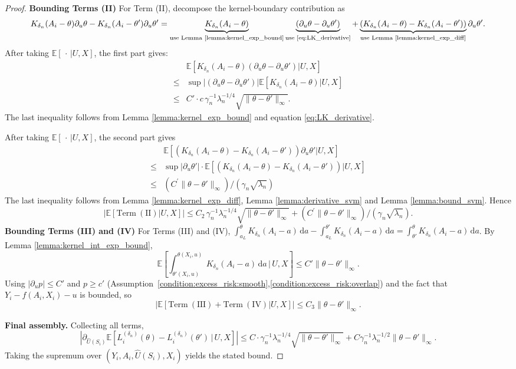 \documentclass[12pt]{article}
\newcommand{\E}{\mathbb{E}}
\begin{document}
\begin{proof}
\noindent\textbf{Bounding Terms (II)}
For Term (II), decompose the kernel-boundary contribution as
$$K_{\delta_n}(A_i-\theta)\partial_u\theta - K_{\delta_n}(A_i-\theta')\partial_u\theta' = \underbrace{K_{\delta_n}(A_i-\theta)}_{\text{use Lemma \ref{lemma:kernel_exp_bound}}}\underbrace{(\partial_u\theta-\partial_u\theta')}_{\text{use \eqref{eq:LK_derivative}}} + \underbrace{(K_{\delta_n}(A_i-\theta)-K_{\delta_n}(A_i-\theta'))}_{\text{use Lemma \ref{lemma:kernel_exp_diff}}}\partial_u\theta'.$$
After taking $\E[\,\cdot\,|U,X]$, the first part gives:
\begin{align*}
&\E\left[K_{\delta_n}(A_i-\theta)(\partial_u\theta-\partial_u\theta')|U,X\right]\\
\leq & \sup\left|(\partial_u\theta-\partial_u\theta')\right| \E\left[K_{\delta_n}(A_i-\theta)|U,X\right]\\
\leq & C'\cdot c\,\gamma_n^{-1}\lambda_n^{-1/4}\sqrt{\|\theta-\theta'\|_\infty}.
\end{align*}
The last inequality follows from Lemma \ref{lemma:kernel_exp_bound} and equation \eqref{eq:LK_derivative}.

After taking $\E[\,\cdot\,|U,X]$, the second part gives
\begin{align*}
    &\E\left[(K_{\delta_n}(A_i-\theta)-K_{\delta_n}(A_i-\theta'))\partial_u\theta'|U,X\right]\\
    \leq & \sup|\partial_u\theta'| \cdot \E\left[(K_{\delta_n}(A_i-\theta)-K_{\delta_n}(A_i-\theta'))|U,X\right]\\
    \leq &(C^\prime\|\theta-\theta'\|_\infty)/(\gamma_n\sqrt{\lambda_n})
\end{align*}
The last inequality follows from Lemma \ref{lemma:kernel_exp_diff}, Lemma \ref{lemma:derivative_svm} and Lemma \ref{lemma:bound_svm}. Hence
$$\left|\E[\mathrm{Term\ (II)}|U,X]\right| \leq C_2\,\gamma_n^{-1}\lambda_n^{-1/4}\sqrt{\|\theta-\theta'\|_\infty}+(C^\prime\|\theta-\theta'\|_\infty)/(\gamma_n\sqrt{\lambda_n}).$$
\noindent\textbf{Bounding Terms (III) and (IV)}
For Terms (III) and (IV), $\int_{a_L}^{\theta}K_{\delta_n}(A_i-a)\,\mathrm{d}a - \int_{a_L}^{\theta'}K_{\delta_n}(A_i-a)\,\mathrm{d}a = \int_{\theta'}^{\theta}K_{\delta_n}(A_i-a)\,\mathrm{d}a$.  By Lemma \ref{lemma:kernel_int_exp_bound},
$$\E\!\left[\int_{\theta'(X_i,u)}^{\theta(X_i,u)}K_{\delta_n}(A_i-a)\,\mathrm{d}a\,\bigg|\,U,X\right] \leq C'\|\theta-\theta'\|_\infty.$$
Using $|\partial_u p|\leq C'$ and $p\geq c'$ (Assumption~\ref{condition:excess_risk:smooth},\ref{condition:excess_risk:overlap}) and the fact that $Y_i-f(A_i,X_i)-u$ is bounded,  so
$$\left|\E[\mathrm{Term\ (III)}+\mathrm{Term\ (IV)}|U,X]\right| \leq C_3\|\theta-\theta'\|_\infty.$$

\noindent\textbf{Final assembly.}
Collecting all terms,
$$\left|\partial_{\widehat U(S_i)}\E\!\left[L^{(\delta_n)}_i(\theta)-L^{(\delta_n)}_i(\theta')\,\big|\,U,X\right]\right|\leq C\cdot \gamma_n^{-1}\lambda_n^{-1/4}\sqrt{\|\theta-\theta'\|_\infty} + C\gamma_n^{-1}\lambda_n^{-1/2}\|\theta-\theta'\|_\infty.$$
Taking the supremum over $(Y_i,A_i,\widehat{U}(S_i),X_i)$ yields the stated bound.
\end{proof}
\end{document}
